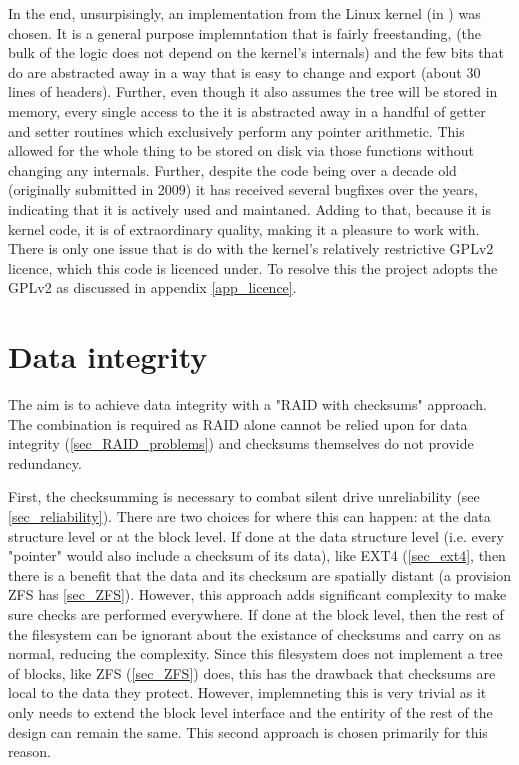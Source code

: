         In the end, unsurpisingly, an implementation from the Linux kernel (in
         \cite{Linux_source}) was chosen. It is a
        general purpose \bplustree implemntation that is fairly freestanding,
        (the bulk of the logic does not depend on the kernel's internals) and
        the few bits that do are abstracted away in a way that is easy to
        change and export (about 30 lines of headers). Further, even though it
        also assumes the tree will be stored in memory, every single access to
        the it is abstracted away in a handful of getter and setter routines
        which exclusively perform any pointer arithmetic. This allowed for the
        whole thing to be stored on disk via those functions without changing
        any internals. Further, despite the code being over a decade old
        (originally submitted in 2009) it has received several bugfixes over
        the years, indicating that it is actively used and maintaned. Adding to
        that, because it is kernel code, it is of extraordinary quality, making
        it a pleasure to work with. There is only one issue that is do with the
        kernel's relatively restrictive GPLv2 licence, which this code is
        licenced under. To resolve this the project adopts the GPLv2 as
        discussed in appendix \ref{app_licence}.

    \section{Data integrity}
        \label{sec_data_integrity}

        The aim is to achieve data integrity with a "RAID with checksums"
        approach. The combination is required as RAID alone cannot be relied
        upon for data integrity (\ref{sec_RAID_problems}) and checksums
        themselves do not provide redundancy.

        First, the checksumming is necessary to combat silent drive
        unreliability (see \ref{sec_reliability}). There are two choices for
        where this can happen: at the data structure level or at the block
        level. If done at the data structure level (i.e. every "pointer" would
        also include a checksum of its data), like EXT4 (\ref{sec_ext4}, then
        there is a benefit that the data and its checksum are spatially distant
        (a provision ZFS has \ref{sec_ZFS}). However, this approach adds
        significant complexity to make sure checks are performed everywhere. If
        done at the block level, then the rest of the filesystem can be
        ignorant about the existance of checksums and carry on as normal,
        reducing the complexity. Since this filesystem does not implement a
        tree of blocks, like ZFS (\ref{sec_ZFS}) does, this has the drawback
        that checksums are local to the data they protect. However,
        implemneting this is very trivial as it only needs to extend the block
        level interface and the entirity of the rest of the design can remain
        the same. This second approach is chosen primarily for this reason.

